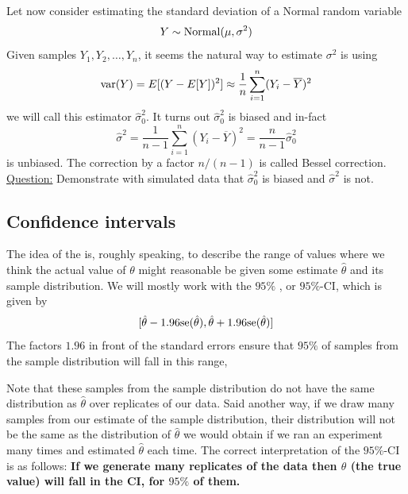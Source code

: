 \begin{example}
Let now consider estimating the standard deviation of a Normal random variable
\begin{equation*}
Y \sim {\rm Normal}(\mu,\sigma^2)
\end{equation*}
Given samples $Y_1,Y_2,\dots,Y_n$, it seems the natural way to estimate $\sigma^2$ is using
\begin{equation*}
{\rm var}(Y) = E[(Y-E[Y])^2] \approx \frac{1}{n}\sum_{i=1}^n(Y_i-\overline{Y})^2
\end{equation*}
we will call this estimator $\hat{\sigma}_0^2$. It turns out $\hat{\sigma}_0^2$ is biased and in-fact 
\begin{equation*}
\hat{\sigma}^2 = \frac{1}{n-1}\sum_{i=1}^n(Y_i-\overline{Y})^2 = \frac{n}{n-1}\hat{\sigma}_0^2
\end{equation*}
is unbiased. The correction by a factor $n/(n-1)$ is called Bessel correction. \\

\noindent
\underline{Question:} Demonstrate with simulated data that $\hat{\sigma}_0^2$ is biased and $\hat{\sigma}^2$ is not. 


\end{example}






\subsection{Confidence intervals}


The idea of the  is, roughly speaking, to describe the range of values where we think the actual value of $\theta$ might reasonable be given some estimate $\hat{\theta}$ and its sample distribution. We will mostly work with the $95\%$ , or $95\%$-CI, which is given by 
\begin{equation}\label{eq:95CI}
[\hat{\theta} - 1.96{\rm se}(\hat{\theta}), \hat{\theta} + 1.96{\rm se}(\hat{\theta})]
\end{equation}
The factors $1.96$ in front of the standard errors ensure that $95\%$ of samples from the sample distribution will fall in this range, 



Note that these samples from the sample distribution do not have the same distribution as $\hat{\theta}$ over replicates of our data. Said another way, if we draw many samples from our estimate of the sample distribution, their distribution will not be the same as the distribution of $\hat{\theta}$ we would obtain if we ran an experiment many times and estimated $\hat{\theta}$ each time. The correct interpretation of the $95\%$-CI is as follows: {\bf If we generate many replicates of the data then $\theta$ (the true value) will fall in the CI, for $95\%$ of them.} 

